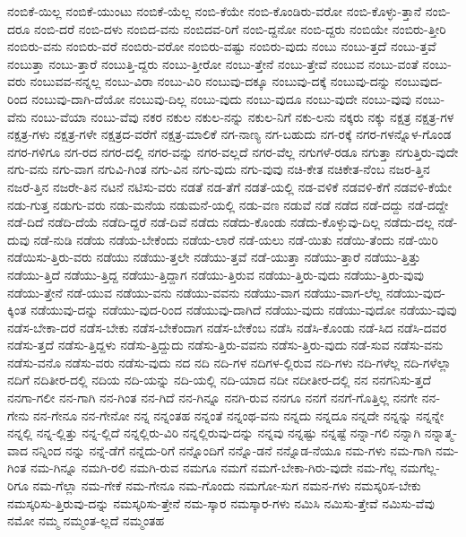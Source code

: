{ನಂಬಿಕೆ-ಯಿಲ್ಲ
ನಂಬಿಕೆ-ಯುಂಟು
ನಂಬಿಕೆ-ಯೆಲ್ಲ
ನಂಬಿ-ಕೆಯೇ
ನಂಬಿ-ಕೊಂಡಿರು-ವರೋ
ನಂಬಿ-ಕೊಳ್ಳು-ತ್ತಾನೆ
ನಂಬಿ-ದರೂ
ನಂಬಿ-ದರೆ
ನಂಬಿ-ದಳು
ನಂಬಿದ-ವನು
ನಂಬಿದವ-ರಿಗೆ
ನಂಬಿ-ದ್ದನೋ
ನಂಬಿ-ದ್ದರು
ನಂಬಿಯೇ
ನಂಬಿರು-ತ್ತೀರಿ
ನಂಬಿರು-ವನು
ನಂಬಿರು-ವರೆ
ನಂಬಿರು-ವರೋ
ನಂಬಿರು-ವಷ್ಟು
ನಂಬಿರು-ವುದು
ನಂಬು
ನಂಬು-ತ್ತದೆ
ನಂಬು-ತ್ತವೆ
ನಂಬುತ್ತಾ
ನಂಬು-ತ್ತಾರೆ
ನಂಬುತ್ತಿ-ದ್ದರು
ನಂಬು-ತ್ತೀರೋ
ನಂಬು-ತ್ತೇನೆ
ನಂಬು-ತ್ತೇವೆ
ನಂಬುವ
ನಂಬು-ವಂತೆ
ನಂಬು-ವರು
ನಂಬುವವ-ನನ್ನಲ್ಲ
ನಂಬು-ವಿರಾ
ನಂಬು-ವಿರಿ
ನಂಬುವು-ದಕ್ಕೂ
ನಂಬುವು-ದಕ್ಕೆ
ನಂಬುವು-ದನ್ನು
ನಂಬುವುದ-ರಿಂದ
ನಂಬುವು-ದಾಗಿ-ದೆಯೋ
ನಂಬುವು-ದಿಲ್ಲ
ನಂಬು-ವುದು
ನಂಬು-ವುದೂ
ನಂಬು-ವುದೇ
ನಂಬು-ವುವು
ನಂಬು-ವೆನು
ನಂಬು-ವೆಯಾ
ನಂಬು-ವೆವು
ನಕರ
ನಕುಲ
ನಕುಲ-ನನ್ನು
ನಕುಲ-ನಿಗೆ
ನಕು-ಲನು
ನಕ್ಕರು
ನಕ್ಕು
ನಕ್ಷತ್ರ
ನಕ್ಷತ್ರ-ಗಳ
ನಕ್ಷತ್ರ-ಗಳು
ನಕ್ಷತ್ರ-ಗಳೇ
ನಕ್ಷತ್ರದ-ವರೆಗೆ
ನಕ್ಷತ್ರ-ಮಾಲಿಕೆ
ನಗ-ನಾಣ್ಯ
ನಗ-ಬಹುದು
ನಗ-ರಕ್ಕೆ
ನಗರ-ಗಳನ್ನೊಳ-ಗೊಂಡ
ನಗರ-ಗಳಿಗೂ
ನಗ-ರದ
ನಗರ-ದಲ್ಲಿ
ನಗರ-ವನ್ನು
ನಗರ-ವಲ್ಲದೆ
ನಗರ-ವೆಲ್ಲ
ನಗುಗಳೆ-ರಡೂ
ನಗುತ್ತಾ
ನಗುತ್ತಿರು-ವುದೇ
ನಗು-ವನು
ನಗು-ವಾಗ
ನಗುವಿ-ಗಿಂತ
ನಗು-ವಿನ
ನಗು-ವುದು
ನಗು-ವುವು
ನಚಿ-ಕೇತ
ನಚಿಕೇತ-ನೆಂಬ
ನಜರ-ತ್ತಿನ
ನಜರೆ-ತ್ತಿನ
ನಜರೇ-ತಿನ
ನಟನೆ
ನಟಿಸು-ವರು
ನಡತೆ
ನಡ-ತೆಗೆ
ನಡತೆ-ಯಲ್ಲಿ
ನಡ-ವಳಿಕೆ
ನಡವಳಿ-ಕೆಗೆ
ನಡವಳಿ-ಕೆಯೇ
ನಡು-ಗುತ್ತ
ನಡುಗು-ವರು
ನಡು-ಮನೆಯ
ನಡುಮನೆ-ಯಲ್ಲಿ
ನಡು-ವಣ
ನಡುವೆ
ನಡೆ
ನಡೆದ
ನಡೆ-ದದ್ದು
ನಡೆ-ದದ್ದೇ
ನಡೆ-ದಿದೆ
ನಡೆದಿ-ದೆಯೆ
ನಡೆದಿ-ದ್ದರೆ
ನಡೆ-ದಿವೆ
ನಡೆದು
ನಡೆದು-ಕೊಂಡು
ನಡೆದು-ಕೊಳ್ಳುವು-ದಿಲ್ಲ
ನಡೆದು-ದಲ್ಲ
ನಡೆ-ದುವು
ನಡೆ-ನುಡಿ
ನಡೆಯ
ನಡೆಯ-ಬೇಕೆಂದು
ನಡೆಯ-ಲಾರೆ
ನಡೆ-ಯಲು
ನಡೆ-ಯಿತು
ನಡೆಯಿ-ತೆಂದು
ನಡೆ-ಯಿರಿ
ನಡೆಯಿಸು-ತ್ತಿರು-ವರು
ನಡೆಯು
ನಡೆಯು-ತ್ತಲೇ
ನಡೆಯು-ತ್ತವೆ
ನಡೆ-ಯುತ್ತಾ
ನಡೆಯು-ತ್ತಾರೆ
ನಡೆಯು-ತ್ತಿತ್ತು
ನಡೆಯು-ತ್ತಿದೆ
ನಡೆಯು-ತ್ತಿದ್ದ
ನಡೆಯು-ತ್ತಿದ್ದಾಗ
ನಡೆಯು-ತ್ತಿರುವ
ನಡೆಯು-ತ್ತಿರು-ವುದು
ನಡೆಯು-ತ್ತಿರು-ವುವು
ನಡೆಯು-ತ್ತೇನೆ
ನಡೆ-ಯುವ
ನಡೆಯು-ವನು
ನಡೆಯು-ವವನು
ನಡೆಯು-ವಾಗ
ನಡೆಯು-ವಾಗ-ಲೆಲ್ಲ
ನಡೆಯು-ವುದ-ಕ್ಕಿಂತ
ನಡೆಯುವು-ದನ್ನು
ನಡೆಯು-ವುದ-ರಿಂದ
ನಡೆಯುವು-ದಾಗಿದೆ
ನಡೆಯು-ವುದು
ನಡೆಯು-ವುದೋ
ನಡೆಯು-ವುವು
ನಡೆಸ-ಬೇಕಾ-ದರೆ
ನಡೆಸ-ಬೇಕು
ನಡೆಸ-ಬೇಕೆಂದಾಗ
ನಡೆಸ-ಬೇಕೆಂಬ
ನಡೆಸಿ
ನಡೆಸಿ-ಕೊಂಡು
ನಡೆ-ಸಿದ
ನಡೆಸಿ-ದವರ
ನಡೆಸು-ತ್ತದೆ
ನಡೆಸು-ತ್ತಿದ್ದಳು
ನಡೆಸು-ತ್ತಿದ್ದುದು
ನಡೆಸು-ತ್ತಿರು-ವವನು
ನಡೆಸು-ತ್ತಿರು-ವುದು
ನಡೆ-ಸುವ
ನಡೆಸು-ವನು
ನಡೆಸು-ವನೊ
ನಡೆಸು-ವರು
ನಡೆಸು-ವುದು
ನದ
ನದಿ
ನದಿ-ಗಳ
ನದಿಗಳ-ಲ್ಲಿರುವ
ನದಿ-ಗಳು
ನದಿ-ಗಳೆಲ್ಲ
ನದಿ-ಗಳೆಲ್ಲಾ
ನದಿಗೆ
ನದಿತೀರ-ದಲ್ಲಿ
ನದಿಯ
ನದಿ-ಯನ್ನು
ನದಿ-ಯಲ್ಲಿ
ನದಿ-ಯಾದ
ನದೀ
ನದೀತೀರ-ದಲ್ಲಿ
ನನ
ನನಗನಿಸು-ತ್ತದೆ
ನನಗಾ-ಗಲೀ
ನನ-ಗಾಗಿ
ನನ-ಗಿಂತ
ನನ-ಗಿದೆ
ನನ-ಗಿನ್ನೂ
ನನಗಿ-ರುವ
ನನಗೂ
ನನಗೆ
ನನಗೆ-ಗೊತ್ತಿಲ್ಲ
ನನಗೇ
ನನ-ಗೇನು
ನನ-ಗೇನೂ
ನನ-ಗೇನೋ
ನನ್ನ
ನನ್ನಂತಹ
ನನ್ನಂತೆ
ನನ್ನಂಥ-ವನು
ನನ್ನದು
ನನ್ನದೂ
ನನ್ನದೇ
ನನ್ನನ್ನು
ನನ್ನನ್ನೇ
ನನ್ನಲ್ಲಿ
ನನ್ನ-ಲ್ಲಿತ್ತು
ನನ್ನ-ಲ್ಲಿದೆ
ನನ್ನಲ್ಲಿರು-ವಿರಿ
ನನ್ನಲ್ಲಿರುವು-ದನ್ನು
ನನ್ನವು
ನನ್ನಷ್ಟು
ನನ್ನಷ್ಟೆ
ನನ್ನಾ-ಗಲಿ
ನನ್ನಾಗಿ
ನನ್ನಾತ್ಮ-ವಾದ
ನನ್ನಿಂದ
ನನ್ನು
ನನ್ನೆ-ಡೆಗೆ
ನನ್ನೆದು-ರಿಗೆ
ನನ್ನೊಂದಿಗೆ
ನನ್ನೊ-ಡನೆ
ನನ್ನೊಡ-ನೆಯೂ
ನಮ-ಗಳು
ನಮ-ಗಾಗಿ
ನಮ-ಗಿಂತ
ನಮ-ಗಿನ್ನೂ
ನಮಗಿ-ರಲಿ
ನಮಗಿ-ರುವ
ನಮಗೂ
ನಮಗೆ
ನಮಗೆ-ಬೇಕಾ-ಗಿರು-ವುದೇ
ನಮ-ಗೆಲ್ಲ
ನಮಗೆಲ್ಲ-ರಿಗೂ
ನಮ-ಗೆಲ್ಲಾ
ನಮ-ಗೇಕೆ
ನಮ-ಗೇನೂ
ನಮ-ಗೊಂದು
ನಮಗೋ-ಸುಗ
ನಮನ-ಗಳು
ನಮಸ್ಕರಿಸ-ಬೇಕು
ನಮಸ್ಕರಿಸು-ತ್ತಿರುವು-ದನ್ನು
ನಮಸ್ಕರಿಸು-ತ್ತೇನೆ
ನಮ-ಸ್ಕಾರ
ನಮಸ್ಕಾರ-ಗಳು
ನಮಿಸಿ
ನಮಿಸು-ತ್ತೇವೆ
ನಮಿಸು-ವೆವು
ನಮೋ
ನಮ್ಮ
ನಮ್ಮಂತ-ಲ್ಲದೆ
ನಮ್ಮಂತಹ
}
